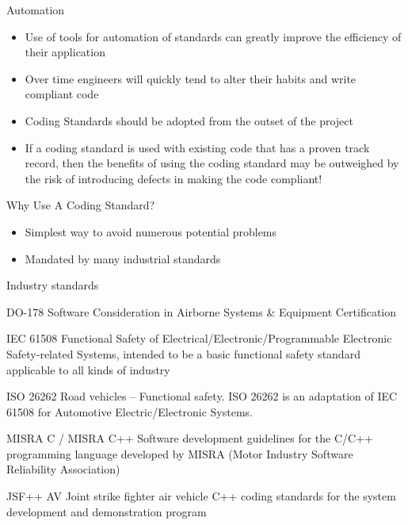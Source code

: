 \documentclass{beamer}
\begin{document}
\begin{frame}{Automation}
\begin{itemize}
  \item Use of tools for automation of standards can greatly improve the
  efficiency of their application
  \item Over time engineers will quickly tend to alter their habits and write
  compliant code
  \item Coding Standards should be adopted from the outset of the project
  \item If a coding standard is used with existing code that has a proven track
  record, then the benefits of using the coding standard may be outweighed by
  the risk of introducing defects in making the code compliant!
\end{itemize}
\end{frame}

\begin{frame}{Why Use A Coding Standard?}
\begin{itemize}
  \item Simplest way to avoid numerous potential problems
  \item Mandated by many industrial standards
\end{itemize}
\end{frame}

\begin{frame}{Industry standards}
\begin{block}{DO-178}
Software Consideration in Airborne Systems \& Equipment Certification
\end{block}

\begin{block}{IEC 61508}
Functional Safety of Electrical/Electronic/Programmable Electronic
Safety-related Systems, intended to be a basic functional safety
standard applicable to all kinds of industry
\end{block}

\begin{block}{ISO 26262}
Road vehicles – Functional safety. ISO 26262 is an adaptation of IEC 61508 for
Automotive Electric/Electronic Systems.
\end{block}

\begin{block}{MISRA C / MISRA C++}
Software development guidelines for the C/C++ programming language developed by
MISRA (Motor Industry Software Reliability Association)
\end{block}

\begin{block}{JSF++ AV}
Joint strike fighter air vehicle C++ coding standards for the system
development and demonstration program
\end{block}
\end{frame}
\end{document}
